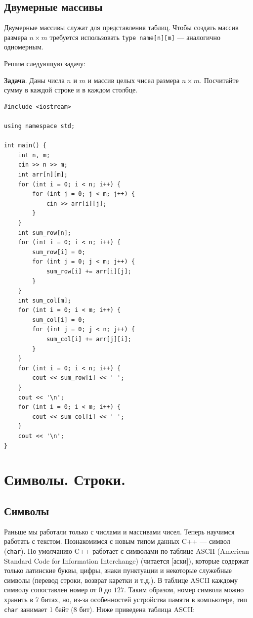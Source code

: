 \documentclass{article}
\newcommand{\task}[1]{\textbf{Задача}. #1}
\begin{document}
	\subsection{Двумерные массивы}
	
	Двумерные массивы служат для представления таблиц. Чтобы создать массив размера $n\times m$ требуется использовать \texttt{type name[n][m]} --- аналогично одномерным.

	Решим следующую задачу:

	\task{Даны числа $n$ и $m$ и массив целых чисел размера $n\times m$. Посчитайте сумму в каждой строке и в каждом столбце.}

	\begin{lstlisting}
#include <iostream>

using namespace std;

int main() {
	int n, m;
	cin >> n >> m;
	int arr[n][m];
	for (int i = 0; i < n; i++) {
		for (int j = 0; j < m; j++) {
			cin >> arr[i][j];
		}
	}
	int sum_row[n];
	for (int i = 0; i < n; i++) {
		sum_row[i] = 0;
		for (int j = 0; j < m; j++) {
			sum_row[i] += arr[i][j];
		}
	}
	int sum_col[m];
	for (int i = 0; i < m; i++) {
		sum_col[i] = 0;
		for (int j = 0; j < n; j++) {
			sum_col[i] += arr[j][i];
		}
	}
	for (int i = 0; i < n; i++) {
		cout << sum_row[i] << ' ';
	}
	cout << '\n';
	for (int i = 0; i < m; i++) {
		cout << sum_col[i] << ' ';
	}
	cout << '\n';
}
	\end{lstlisting}
	
	\section{Символы. Строки.}
	
	\subsection{Символы}
	
	Раньше мы работали только с числами и массивами чисел. Теперь научимся работать с текстом. Познакомимся с новым типом данных C++ --- символ (\texttt{char}). По умолчанию C++ работает с символами по таблице ASCII (American Standard Code for Information Interchange) (читается [аски]), которые содержат только латинские буквы, цифры, знаки пунктуации и некоторые служебные символы (перевод строки, возврат каретки и т.д.). В таблице ASCII каждому символу сопоставлен номер от $0$ до $127$. Таким образом, номер символа можно хранить в 7 битах, но, из-за особенностей устройства памяти в компьютере, тип \texttt{char} занимает 1 байт (8 бит). Ниже приведена таблица ASCII:
	
\end{document}
